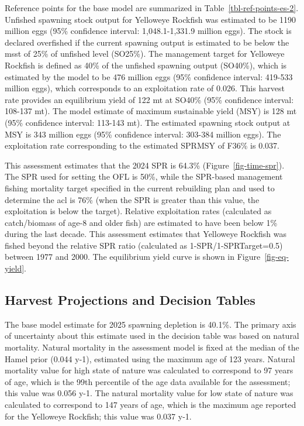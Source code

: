 \documentclass[
]{scrartcl}
\begin{document}
Reference points for the base model are summarized in
Table~\ref{tbl-ref-points-es-2}. Unfished spawning stock output for
Yelloweye Rockfish was estimated to be 1190 million eggs (95\%
confidence interval: 1,048.1-1,331.9 million eggs). The stock is
declared overfished if the current spawning output is estimated to be
below the \gls{msst} of 25\% of unfished level (SO25\%). The management
target for Yelloweye Rockfish is defined as 40\% of the unfished
spawning output (SO40\%), which is estimated by the model to be 476
million eggs (95\% confidence interval: 419-533 million eggs), which
corresponds to an exploitation rate of 0.026. This harvest rate provides
an equilibrium yield of 122 mt at SO40\% (95\% confidence interval:
108-137 mt). The model estimate of maximum sustainable yield (MSY) is
128 mt (95\% confidence interval: 113-143 mt). The estimated spawning
stock output at MSY is 343 million eggs (95\% confidence interval:
303-384 million eggs). The exploitation rate corresponding to the
estimated SPRMSY of F36\% is 0.037.

This assessment estimates that the 2024 SPR is 64.3\%
(Figure~\ref{fig-time-spr}). The SPR used for setting the OFL is 50\%,
while the SPR-based management fishing mortality target specified in the
current rebuilding plan and used to determine the \gls{acl} is 76\%
(when the SPR is greater than this value, the exploitation is below the
target). Relative exploitation rates (calculated as catch/biomass of
age-8 and older fish) are estimated to have been below 1\% during the
last decade. This assessment estimates that Yelloweye Rockfish was
fished beyond the relative SPR ratio (calculated as
1-SPR/1-SPRTarget=0.5) between 1977 and 2000. The equilibrium yield
curve is shown in Figure~\ref{fig-eq-yield}.

\subsection{Harvest Projections and Decision
Tables}\label{harvest-projections-and-decision-tables}

The base model estimate for 2025 spawning depletion is 40.1\%. The
primary axis of uncertainty about this estimate used in the decision
table was based on natural mortality. Natural mortality in the
assessment model is fixed at the median of the Hamel prior (0.044 y-1),
estimated using the maximum age of 123 years. Natural mortality value
for high state of nature was calculated to correspond to 97 years of
age, which is the 99th percentile of the age data available for the
assessment; this value was 0.056 y-1. The natural mortality value for
low state of nature was calculated to correspond to 147 years of age,
which is the maximum age reported for the Yelloweye Rockfish; this value
was 0.037 y-1.
\end{document}
